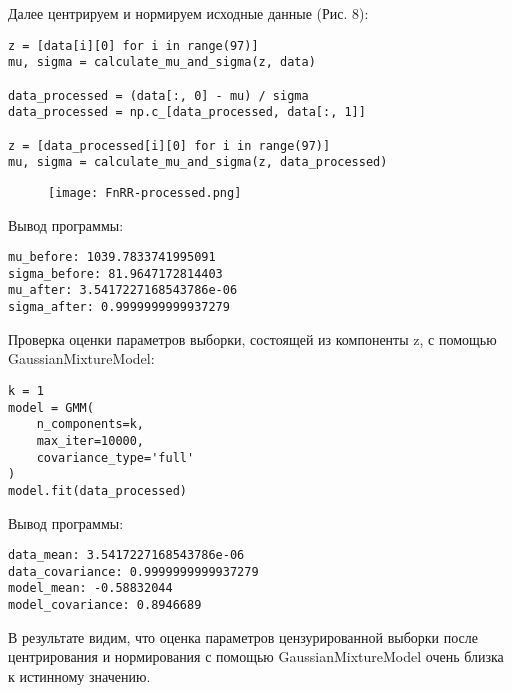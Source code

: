 Далее центрируем и нормируем исходные данные (Рис. 8):
\begin{verbatim}
z = [data[i][0] for i in range(97)]
mu, sigma = calculate_mu_and_sigma(z, data)

data_processed = (data[:, 0] - mu) / sigma
data_processed = np.c_[data_processed, data[:, 1]]

z = [data_processed[i][0] for i in range(97)]
mu, sigma = calculate_mu_and_sigma(z, data_processed)
\end{verbatim}

\begin{figure}[h]
    \begin{center}
        \texttt{[image: FnRR-processed.png]}
        \caption{}
        \label{ris:experimcoded}
    \end{center}
\end{figure}

Вывод программы:
\begin{verbatim}
mu_before: 1039.7833741995091
sigma_before: 81.9647172814403
mu_after: 3.5417227168543786e-06
sigma_after: 0.9999999999937279
\end{verbatim}

Проверка оценки параметров выборки, состоящей из компоненты z, с помощью GaussianMixtureModel:
\begin{verbatim}
k = 1
model = GMM(
    n_components=k,
    max_iter=10000,
    covariance_type='full'
)
model.fit(data_processed)
\end{verbatim}

Вывод программы:
\begin{verbatim}
data_mean: 3.5417227168543786e-06
data_covariance: 0.9999999999937279
model_mean: -0.58832044
model_covariance: 0.8946689
\end{verbatim}

В результате видим, что оценка параметров цензурированной выборки после центрирования и нормирования с помощью GaussianMixtureModel очень близка к истинному значению.